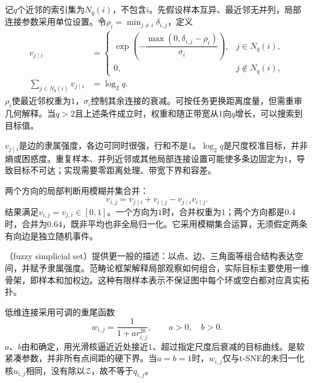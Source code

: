 记$q$个近邻的索引集为$N_q(i)$，不包含$i$。先假设样本互异、最近邻无并列，局部连接参数采用单位设置。令$\rho_i=\min_{j\ne i}\delta_{i,j}$，定义
\begin{equation}
  \label{eq:dim-umap-directed}
  \begin{aligned}
    v_{j\mid i}
      &=
      \begin{cases}
        \exp\!\left(-\dfrac{\max(0,\delta_{i,j}-\rho_i)}
        {\sigma_i}\right),&j\in N_q(i),\\
        0,&j\notin N_q(i),
      \end{cases}\\
    \sum_{j\in N_q(i)}v_{j\mid i}&=\log_2 q.
  \end{aligned}
\end{equation}
$\rho_i$使最近邻权重为$1$，$\sigma_i$控制其余连接的衰减。可按任务更换距离度量，但需重审几何解释。当$q>2$且上述条件成立时，权重和随正带宽从$1$向$q$增长，可以搜索到目标值。

$v_{j\mid i}$是边的隶属强度，各边可同时很强，行和不是$1$。$\log_2 q$是尺度校准目标，并非熵或困惑度。重复样本、并列近邻或其他局部连接设置可能使多条边固定为$1$，导致目标不可达；实现需要零距离处理、带宽下界和容差。

两个方向的局部判断用模糊并集合并：
\begin{equation}
  \label{eq:dim-umap-union}
  v_{i,j}=v_{j\mid i}+v_{i\mid j}-v_{j\mid i}v_{i\mid j}.
\end{equation}
结果满足$v_{i,j}=v_{j,i}\in[0,1]$。一个方向为$1$时，合并权重为$1$；两个方向都是$0.4$时，合并为$0.64$，既非平均也非全局归一化。它采用模糊集合运算，无须假定两条有向边是独立随机事件。

（fuzzy simplicial set）提供更一般的描述：以点、边、三角面等组合结构表达空间，并赋予隶属强度。范畴论框架解释局部观察如何组合，实际目标主要使用一维骨架，即样本和加权边。这种有限样本表示不保证图中每个环或空白都对应真实拓扑。

低维连接采用可调的重尾函数
\begin{equation}
  \label{eq:dim-umap-kernel}
  w_{i,j}=\frac{1}{1+a r_{i,j}^{2b}},\qquad a>0,\quad b>0.
\end{equation}
$a$、$b$由和确定，用光滑核逼近近处接近$1$、超过指定尺度后衰减的目标曲线。是软紧凑参数，并非所有点间距的硬下界。当$a=b=1$时，$w_{i,j}$仅与t-SNE的未归一化核$u_{i,j}$相同，没有除以$\mathcal{Z}$，故不等于$q_{i,j}$。

